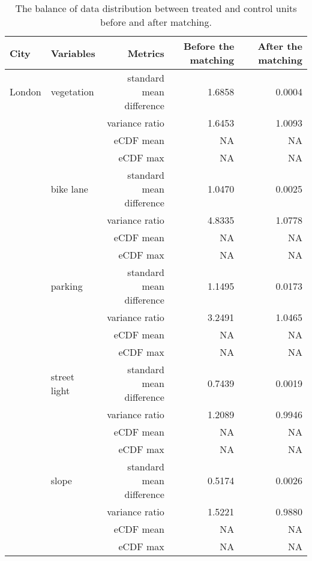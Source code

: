 \begin{table}[!htp]\centering
\caption{The balance of data distribution between treated and control units before and after matching.}\label{result:tab:match_result}
\scriptsize
\begin{tabular}{llrrr}\toprule
City&Variables&Metrics&Before the matching &After the matching \\\midrule

London & vegetation & standard mean difference & 1.6858 & \cellcolor{customgreen} 0.0004 \\
 &  & variance ratio & 1.6453 & \cellcolor{customgreen} 1.0093 \\
 &  & eCDF mean & NA &  NA \\
 &  & eCDF max & NA &  NA \\
 & bike lane & standard mean difference & 1.0470 & \cellcolor{customgreen} 0.0025 \\
 &  & variance ratio & 4.8335 & \cellcolor{customgreen} 1.0778 \\
 &  & eCDF mean & NA &  NA \\
 &  & eCDF max & NA &  NA \\
 & parking & standard mean difference & 1.1495 & \cellcolor{customgreen} 0.0173 \\
 &  & variance ratio & 3.2491 & \cellcolor{customgreen} 1.0465 \\
 &  & eCDF mean & NA &  NA \\
 &  & eCDF max & NA &  NA \\
 & street light & standard mean difference & 0.7439 & \cellcolor{customgreen} 0.0019 \\
 &  & variance ratio & 1.2089 & \cellcolor{customgreen} 0.9946 \\
 &  & eCDF mean & NA &  NA \\
 &  & eCDF max & NA &  NA \\
 & slope & standard mean difference & 0.5174 & \cellcolor{customgreen} 0.0026 \\
 &  & variance ratio & 1.5221 & \cellcolor{customgreen} 0.9880 \\
 &  & eCDF mean & NA &  NA \\
 &  & eCDF max & NA &  NA \\
\bottomrule
\end{tabular}
\end{table}

